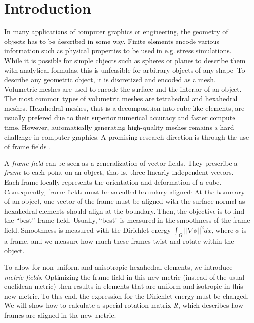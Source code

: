 \documentclass[../thesis.tex]{subfiles}
\begin{document}
\chapter{Introduction}
\label{ch:intro}
In many applications of computer graphics or engineering, the geometry of objects
has to be described in some way. Finite elements encode various information such as physical properties
to be used in e.g. stress simulations.
While it is possible for simple objects such as spheres or planes to describe them
with analytical formulas, this is unfeasible for arbitrary objects of any shape.
To describe any geometric object, it is discretized and encoded as a mesh.
Volumetric meshes are used to encode the surface and the interior of an object.
The most common types of volumetric meshes are tetrahedral and hexahedral meshes.
Hexahedral meshes, that is a decomposition into cube-like elements,
are usually prefered due to their superior numerical accuracy and faster compute time.
However, automatically generating high-quality meshes remains a hard challenge
in computer graphics.
A promising research direction is through the use of frame fields \cite{Hex22}.

A \emph{frame field} can be seen as a generalization of vector fields.
They prescribe a \emph{frame} to each point on an object, that is, three linearly-independent
vectors. Each frame locally represents the orientation and deformation of a cube.
Consequently, frame fields must be so called boundary-aligned:
At the boundary of an object, one vector of the frame must be aligned with the surface normal
as hexahedral elements should align at the boundary.
Then, the objective is to find the ``best'' frame field.
Usually, ``best'' is measured in the smoothness of the frame field.
Smoothness is measured with the Dirichlet energy $\int_{\Omega}||\nabla \phi||^2dx$,
where $\phi$ is a frame, and we measure how much these frames twist and rotate within the object.

To allow for non-uniform and anisotropic hexahedral elements, we introduce
\emph{metric fields}. Optimizing the frame field in this new metric (instead of the usual euclidean metric) then results
in elements that are uniform and isotropic in this new metric.
To this end, the expression for the Dirichlet energy must be changed.
We will show how to calculate a special rotation matrix $R$, which describes
how frames are aligned in the new metric.
\end{document}
